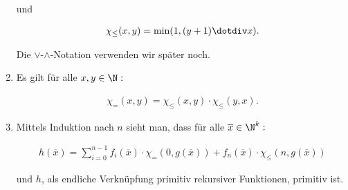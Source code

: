 \begin{solution}
\begin{enumerate}[label = (\alph*), start = 4]
    und

    \begin{align*}
        \chi_\leq(x, y)
        =
        \min(1, (y + 1) \dotdiv x).
    \end{align*}

    Die $\lor$-$\land$-Notation verwenden wir später noch.

    \item Es gilt für alle $x, y \in \N:$

    \begin{align*}
        \chi_=(x, y)
        =
        \chi_\leq(x, y) \cdot \chi_\leq(y, x).
    \end{align*}

    \item Mittels Induktion nach $n$ sieht man, dass für alle $\overline x \in \N^k:$
    
    \begin{align*}
        h(\overline x)
        =
        \sum_{i=0}^{n-1}
            f_i(\overline x)
            \cdot
            \chi_=(0, g(\overline x))
        +
        f_n(\overline x)
        \cdot
        \chi_\leq(n, g(\overline x))
    \end{align*}

    und $h$, als endliche Verknüpfung primitiv rekursiver Funktionen, primitiv ist.

\end{enumerate}

\end{solution}

